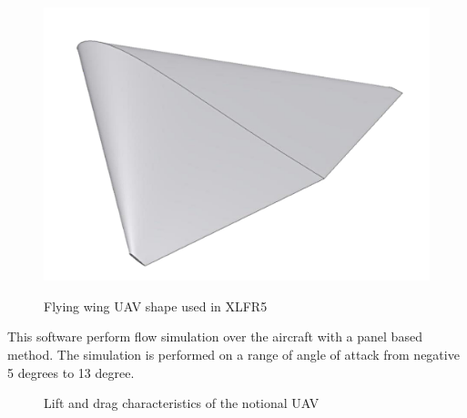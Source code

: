 \begin{figure}[ht]
  \begin{center}
    \scalebox{0.5}            %
    {\includegraphics{./Figures/UAV.png}}
  \end{center}
  \caption{Flying wing UAV shape used in XLFR5}
  \label{fig:UAV}
\end{figure}

\par This software perform flow simulation over the aircraft with a panel based method. 
The simulation is performed on a range of angle of attack from negative 5 degrees to 13 degree.

\begin{figure}[h!]
  \centering
    \caption{Lift and drag characteristics of the notional UAV}
    \label{fig:Cd_and_Cl_UAV}
  \end{figure}

